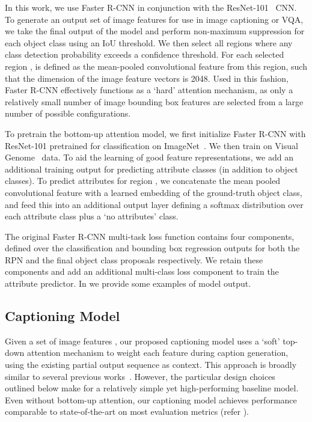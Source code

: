 \documentclass[10pt,twocolumn,letterpaper]{article}
\begin{document}
In this work, we use Faster R-CNN in conjunction with the ResNet-101~\cite{he2015deep} CNN. To generate an output set of image features  for use in image captioning or VQA, we take the final output of the model and perform non-maximum suppression for each object class using an IoU threshold. We then select all regions where any class detection probability exceeds a confidence threshold. 
For each selected region ,  is defined as the mean-pooled convolutional feature from this region, such that the dimension  of the image feature vectors is 2048. Used in this fashion, Faster R-CNN effectively functions as a `hard' attention mechanism, as only a relatively small number of image bounding box features are selected from a large number of possible configurations. 

To pretrain the bottom-up attention model, we first initialize Faster R-CNN with ResNet-101 pretrained for classification on ImageNet~\cite{ILSVRC15}. We then train on Visual Genome~\cite{krishnavisualgenome} data. To aid the learning of good feature representations, we add an additional training output for predicting attribute classes (in addition to object classes). To predict attributes for region , we concatenate the mean pooled convolutional feature  with a learned embedding of the ground-truth object class, and feed this into an additional output layer defining a softmax distribution over each attribute class plus a `no attributes' class.

The original Faster R-CNN multi-task loss function contains four components, defined over the classification and bounding box regression outputs for both the RPN and the final object class proposals respectively. We retain these components and add an additional multi-class loss component to train the attribute predictor. In  we provide some examples of model output. 

\subsection{Captioning Model}
\label{sec:cap}

Given a set of image features , our proposed captioning model uses a `soft' top-down attention mechanism to weight each feature during caption generation, using the existing partial output sequence as context. This approach is broadly similar to several previous works~\cite{scst2016,sentinel,Xu2015}. However, the particular design choices outlined below make for a relatively simple yet high-performing baseline model. Even without bottom-up attention, our captioning model achieves performance comparable to state-of-the-art on most evaluation metrics (refer ).
\end{document}
